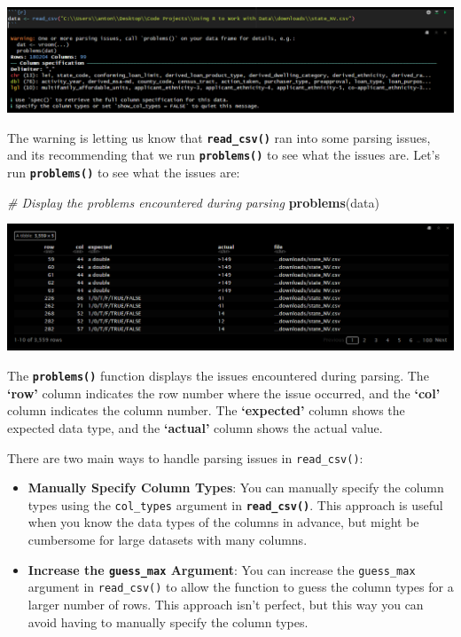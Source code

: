 \documentclass[
]{book}
\newenvironment{Shaded}{\begin{snugshade}}{\end{snugshade}}
\newcommand{\CommentTok}[1]{\textcolor[rgb]{0.56,0.35,0.01}{\textit{#1}}}
\newcommand{\FunctionTok}[1]{\textcolor[rgb]{0.13,0.29,0.53}{\textbf{#1}}}
\newcommand{\NormalTok}[1]{#1}
\providecommand{\tightlist}{%
  \setlength{\itemsep}{0pt}\setlength{\parskip}{0pt}}
\begin{document}
\includegraphics{images/clipboard-3586307356.png}

The warning is letting us know that \textbf{\texttt{read\_csv()}} ran into some parsing issues, and its recommending that we run \textbf{\texttt{problems()}} to see what the issues are. Let's run \textbf{\texttt{problems()}} to see what the issues are:

\begin{Shaded}
\begin{Highlighting}[]
\CommentTok{\# Display the problems encountered during parsing}
\FunctionTok{problems}\NormalTok{(data)}
\end{Highlighting}
\end{Shaded}

\includegraphics{images/clipboard-1927136276.png}

The \textbf{\texttt{problems()}} function displays the issues encountered during parsing. The \textbf{`row'} column indicates the row number where the issue occurred, and the \textbf{`col'} column indicates the column number. The \textbf{`expected'} column shows the expected data type, and the \textbf{`actual'} column shows the actual value.

There are two main ways to handle parsing issues in \texttt{read\_csv()}:

\begin{itemize}
\tightlist
\item
  \textbf{Manually Specify Column Types}: You can manually specify the column types using the \texttt{col\_types} argument in \textbf{\texttt{read\_csv()}}. This approach is useful when you know the data types of the columns in advance, but might be cumbersome for large datasets with many columns.
\item
  \textbf{Increase the \texttt{guess\_max} Argument}: You can increase the \texttt{guess\_max} argument in \texttt{read\_csv()} to allow the function to guess the column types for a larger number of rows. This approach isn't perfect, but this way you can avoid having to manually specify the column types.
\end{itemize}
\end{document}
